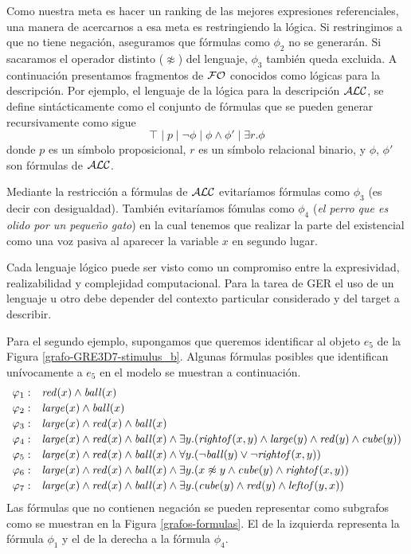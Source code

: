 Como nuestra meta es hacer un ranking de las mejores expresiones referenciales, una manera de acercarnos a esa meta es restringiendo la l\'ogica. Si restringimos a \EPFOL que no tiene negaci\'on, aseguramos que f\'ormulas como $\phi_2$ no se generar\'an. Si sacaramos el operador distinto ($\not\approx$) del lenguaje, $\phi_3$ tambi\'en queda excluida.
A continuaci\'on presentamos fragmentos de $\mathcal{FO}$ conocidos como l\'ogicas para la descripci\'on. Por ejemplo, el lenguaje de la l\'ogica para la descripci\'on $\mathcal{ALC}$, se define sint\'acticamente como el conjunto de f\'ormulas que se pueden generar recursivamente como sigue
$$
\top \mid p \mid \neg \phi \mid \phi \wedge \phi' \mid  \exists r. \phi
$$
donde $p$ es un s\'imbolo proposicional, $r$ es un s\'imbolo relacional binario, y $\phi$, $\phi'$ son f\'ormulas de $\mathcal{ALC}$.

 Mediante la restricci\'on a f\'ormulas de $\mathcal{ALC}$ 
evitar\'iamos f\'ormulas como $\phi_3$ (es decir con desigualdad). Tambi\'en evitar\'iamos f\'omulas como $\phi_4$ ({\it el perro que es olido por un peque\~no gato}) en la cual tenemos que realizar la parte del existencial como una voz pasiva al aparecer la variable $x$ en segundo lugar.

Cada lenguaje l\'ogico puede ser visto como un compromiso entre la expresividad, realizabilidad y complejidad computacional. Para la tarea de GER el uso de un lenguaje u otro debe depender del contexto particular considerado y del target a describir.

Para el segundo ejemplo, supongamos que queremos identificar al objeto $e_5$ de la Figura \ref{grafo-GRE3D7-stimulus_b}. Algunas f\'ormulas posibles  que identifican un\'ivocamente a $e_5$ en el modelo se muestran a continuaci\'on.
$$
\begin{array}{ll}
 \varphi_1: & \mathit{red}(x) \land \mathit{ball}(x)\\[2pt]
 \varphi_2: & \mathit{large}(x) \land \mathit{ball}(x)\\[2pt]
 \varphi_3: & \mathit{large}(x) \land \mathit{red}(x) \land \mathit{ball}(x)\\[2pt]
 \varphi_4: & \mathit{large}(x) \land \mathit{red}(x) \land \mathit{ball}(x) \land
   \exists y . (\mathit{rightof}(x,y) \land \mathit{large}(y) \land \mathit{red}(y) \land \mathit{cube}(y))\\[2pt]
 \varphi_5: & \mathit{large}(x) \land \mathit{red}(x) \land \mathit{ball}(x) \land
  \forall y . (\neg \mathit{ball}(y) \lor \neg \mathit{rightof}(x,y))\\[2pt]
 \varphi_6: & \mathit{large}(x) \land \mathit{red}(x) \land \mathit{ball}(x) \land
  \exists y . (x \not\approx y \land \mathit{cube}(y) \land \mathit{rightof}(x,y))\\[2pt]
 \varphi_7: & \mathit{large}(x) \land \mathit{red}(x) \land \mathit{ball}(x) \land
  \exists y . (\mathit{cube}(y) \land \mathit{red}(y) \land \mathit{leftof}(y,x))
 \end{array}
$$
Las f\'ormulas que no contienen negaci\'on se pueden representar como subgrafos como se muestran en la Figura \ref{grafos-formulas}. El de la izquierda representa la f\'ormula $\phi_1$ y el de la derecha a la f\'ormula $\phi_4$.

